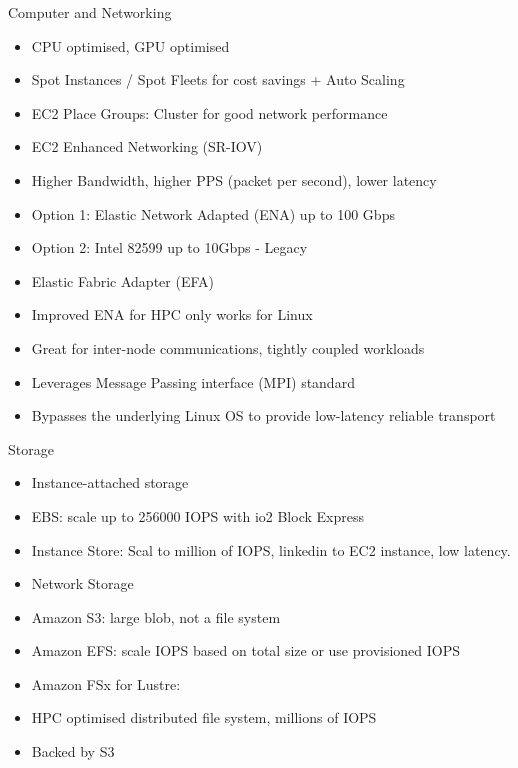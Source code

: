 Computer and Networking
\begin{itemize}
    EC2 Instances:
    \item CPU optimised, GPU optimised
    \item Spot Instances / Spot Fleets for cost savings + Auto Scaling
    \item EC2 Place Groups: Cluster for good network performance
    \item EC2 Enhanced Networking (SR-IOV)
    \item Higher Bandwidth, higher PPS (packet per second), lower latency
    \item Option 1: Elastic Network Adapted (ENA) up to 100 Gbps
    \item Option 2: Intel 82599 up to 10Gbps - Legacy
    \item Elastic Fabric Adapter (EFA)
    \item Improved ENA for HPC only works for Linux
    \item Great for inter-node communications, tightly coupled workloads
    \item Leverages Message Passing interface (MPI) standard
    \item Bypasses the underlying Linux OS to provide low-latency reliable transport
\end{itemize}

Storage
\begin{itemize}
    \item Instance-attached storage
    \item EBS: scale up to 256000 IOPS with io2 Block Express
    \item Instance Store: Scal to million of IOPS, linkedin to EC2 instance, low latency.
\end{itemize}

\begin{itemize}
    \item Network Storage
    \item Amazon S3: large blob, not a file system
    \item Amazon EFS: scale IOPS based on total size or use provisioned IOPS
    \item Amazon FSx for Lustre:
    \item HPC optimised distributed file system, millions of IOPS
    \item Backed by S3
\end{itemize}

